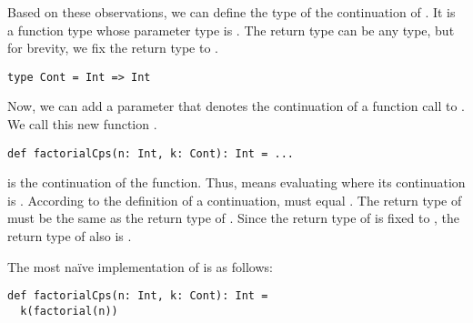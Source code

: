 Based on these observations, we can define the type of the
continuation of .
It is a function type whose parameter type is .
The return type can be any type, but
for brevity, we fix the return type to .

\begin{verbatim}
type Cont = Int => Int
\end{verbatim}

Now, we can add a parameter that denotes the
continuation of a function call to .
We call this new function .

\begin{verbatim}
def factorialCps(n: Int, k: Cont): Int = ...
\end{verbatim}

 is the continuation of the function. Thus,
 means evaluating  where its
continuation is . According to the definition of a continuation,
 must equal .
The return type of  must be the same as the return type of
. Since the return type of  is fixed to , the return
type of  also is .



The most naïve implementation of  is as follows:

\begin{verbatim}
def factorialCps(n: Int, k: Cont): Int =
  k(factorial(n))
\end{verbatim}

